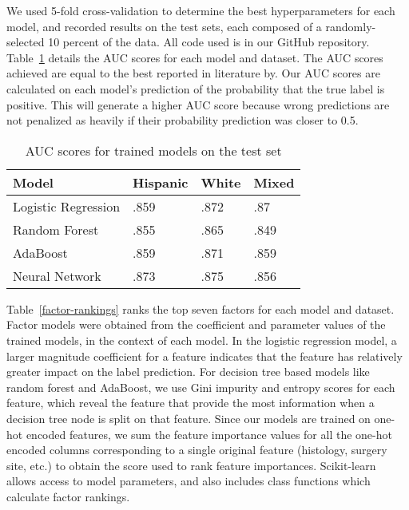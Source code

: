 \documentclass[review]{elsarticle}
\begin{document}
We used 5-fold cross-validation to determine the best hyperparameters for each model, and recorded results on the test sets, each composed of a randomly-selected 10 percent of the data. All code used is in our GitHub repository\cite{cancer_survivability}. Table~\ref{auc-scores} details the AUC scores for each model and dataset. The AUC scores achieved are equal to the best reported in literature by\cite{al2017survivability}. Our AUC scores are calculated on each model's prediction of the probability that the true label is positive. This will generate a higher AUC score because wrong predictions are not penalized as heavily if their probability prediction was closer to 0.5.
\begin{table}[H]
	\centering
	\begin{tabular}{llll}
		\textbf{Model}      & \textbf{Hispanic} & \textbf{White} & \textbf{Mixed}  \\ 
		\hline
		Logistic Regression & .859              & .872           & .87             \\
		Random Forest       & .855              & .865           & .849            \\
		AdaBoost            & .859              & .871           & .859            \\
		Neural Network       & .873              & .875           & .856           
	\end{tabular}
	\caption{AUC scores for trained models on the test set}
	\label{auc-scores}
\end{table}

Table~\ref{factor-rankings} ranks the top seven factors for each model and dataset. Factor models were obtained from the coefficient and parameter values of the trained models, in the context of each model. In the logistic regression model, a larger magnitude coefficient for a feature indicates that the feature has relatively greater impact on the label prediction. For decision tree based models like random forest and AdaBoost, we use Gini impurity and entropy scores for each feature, which reveal the feature that provide the most information when a decision tree node is split on that feature. Since our models are trained on one-hot encoded features, we sum the feature importance values for all the one-hot encoded columns corresponding to a single original feature (histology, surgery site, etc.) to obtain the score used to rank feature importances. Scikit-learn allows access to model parameters, and also includes class functions which calculate factor rankings.
\end{document}
